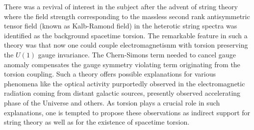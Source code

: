 \documentclass[a4paper,12pt]{article}
\begin{document}
There was a revival of interest in the subject after the advent of
string theory\cite{gsw} where the field strength corresponding to
the massless second rank antisymmetric tensor field (known as
Kalb-Ramond field) in the heterotic string spectra was identified
as the background spacetime torsion. The remarkable feature in
such a theory was that now one could couple electromagnetisnm with
torsion preserving the $U(1)$ gauge invariance\cite{pmssg}. The
Chern-Simons term needed to cancel gauge anomaly compensates the
gauge symmetry violating term originating from the torsion
coupling. Such a theory offers possible explanations for various
phenomena like the optical activity purportedly observed in the
electromagnetic radiation coming from distant galactic
sources,\cite{skpmssgasss} presently observed accelerating phase
of the Universe and others\cite{ssgss}. As torsion plays a crucial
role in such explanations, one is tempted to propose these
observations as indirect support for string theory as well as for
the existence of spacetime torsion.
\end{document}
